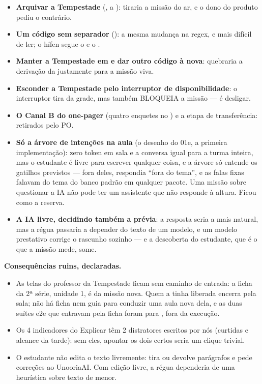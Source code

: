 \begin{itemize}
  \item \textbf{Arquivar a Tempestade} (, a
    ): tiraria a missão do ar, e o dono do produto pediu o
    contrário.
  \item \textbf{Um código sem separador} (): a mesma mudança
    na regex, e mais difícil de ler; o hífen segue o  e o
    .
  \item \textbf{Manter a Tempestade em  e dar outro código à
    nova}: quebraria a derivação da  justamente para a missão
    viva.
  \item \textbf{Esconder a Tempestade pelo interruptor de disponibilidade}: o
    interruptor tira da grade, mas também BLOQUEIA a missão --- é desligar.
  \item \textbf{O Canal B do one-pager} (quatro enquetes no ) e a
    etapa de transferência: retirados pelo PO.
  \item \textbf{Só a árvore de intenções na aula} (o desenho do 01e, a primeira
    implementação): zero token em sala e a conversa igual para a turma
    inteira, mas o estudante é livre para escrever qualquer coisa, e a árvore
    só entende os gatilhos previstos --- fora deles, respondia \enquote{fora do
    tema}, e as falas fixas falavam do tema do banco padrão em qualquer pacote.
    Uma missão sobre questionar a IA não pode ter um assistente que não
    responde à altura. Ficou como a reserva.
  \item \textbf{A IA livre, decidindo também a prévia}: a resposta seria a
    mais natural, mas a régua passaria a depender do texto de um modelo, e um
    modelo prestativo corrige o rascunho sozinho --- e a descoberta do
    estudante, que é o que a missão mede, some.
\end{itemize}

\textbf{Consequências ruins, declaradas.}

\begin{itemize}
  \item As telas do professor da Tempestade ficam sem caminho de entrada: a
    ficha da 2ª série, unidade 1, é da missão nova. Quem a tinha liberada
    encerra pela sala; não há ficha nem guia para conduzir uma aula nova dela,
    e as duas suítes e2e que entravam pela ficha foram para
    , fora da execução.
  \item Os 4 indicadores do Explicar têm 2 distratores escritos por nós
    (curtidas e alcance da tarde): sem eles, apontar os dois certos seria um
    clique trivial.
  \item O estudante não edita o texto livremente: tira ou devolve parágrafos e
    pede correções ao UnooriaAI. Com edição livre, a régua dependeria de uma
    heurística sobre texto de menor.
\end{itemize}

